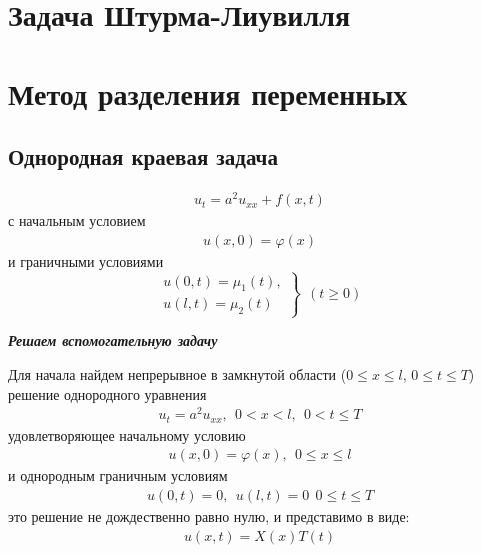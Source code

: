 \documentclass{article}[12pt]
\begin{document}
\section{Задача Штурма-Лиувилля}

\section{Метод разделения переменных}
\subsection{Однородная краевая задача}
\begin{eqnarray*}
    u_{t}=a^{2}u_{xx}+f(x,t)
\end{eqnarray*}
с начальным условием
\begin{eqnarray*}
    u(x,0)=\varphi(x)
\end{eqnarray*}
и граничными условиями
\[
\left.
    \begin{array}{c}
        u(0,t)=\mu_{1}(t),\\
        u(l,t)=\mu_{2}(t)
    \end{array}
\right\}\ \ (t\geqslant 0)
\]
\begin{center}
    \textbf{\textit{Решаем вспомогательную задачу}}
\end{center}

Для начала найдем непрерывное в замкнутой области ($0\leqslant
x\leqslant l$, $0\leqslant t\leqslant T$) решение однородного уравнения
\begin{eqnarray*}
    u_{t}=a^{2}u_{xx},\ \ 0<x<l,\ \ 0<t\leqslant T
\end{eqnarray*}
удовлетворяющее начальному условию
\begin{eqnarray*}
    u(x,0)=\varphi(x),\ \ 0\leqslant x\leqslant l
\end{eqnarray*}
и однородным граничным условиям
\begin{eqnarray*}
    u(0,t)=0,\ \ u(l,t)=0\ \ 0\leqslant t\leqslant T
\end{eqnarray*}
это решение не дождественно равно нулю, и представимо в виде:
\begin{eqnarray*}
    u(x,t)=X(x)T(t)
\end{eqnarray*}
\end{document}
